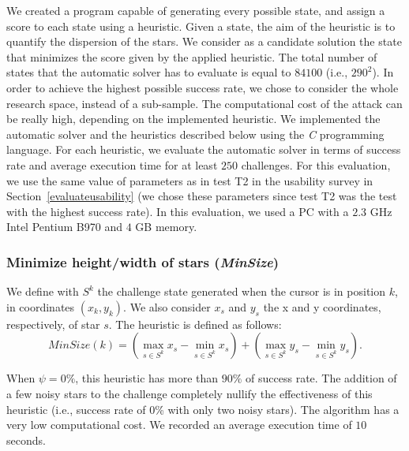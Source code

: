 \documentclass[conference]{IEEEtran}
\newcommand{\hilight}[1]{#1}
\begin{document}
We created a program capable of generating every possible state, and assign a score to each state using a heuristic.
Given a state, the aim of the heuristic is to quantify the dispersion of the stars.
We consider as a candidate solution the state that minimizes the score given by the applied heuristic. The total number of states that the automatic solver has to evaluate is equal to $84100$ (i.e., $290^2$).
\hilight{In order to achieve the highest possible success rate, we chose to consider the whole research space, instead of a sub-sample.}
The computational cost of the attack can be really high, depending on the implemented heuristic.
We implemented the automatic solver and the heuristics described below using the \textit{C} programming language.
For each heuristic, we evaluate the automatic solver in terms of success rate and average execution time for at least $250$ challenges.
For this evaluation, we use the same value of parameters as in test T2 in the usability survey in Section~\ref{evaluateusability} 
(we chose these parameters since test T2 was the test with the highest success rate). 
In this evaluation, we used a PC with a $2.3$ GHz Intel Pentium B970 and $4$ GB memory.

\subsubsection{Minimize height/width of stars (\textit{MinSize})}
We define with $S^k$ the challenge state generated when the cursor is in position $k$, in coordinates $(x_k,y_k)$.
We also consider $x_s$ and $y_s$ the x and y coordinates, respectively, of star $s$.
The heuristic is defined as follows: 
$$ {MinSize}(k) = \left(\max_{s\in S^k } x_s - \min_{s\in S^k } x_s \right) + \left( \max_{s\in S^k } y_s- \min_{s\in S^k } y_s \right).$$


When $\psi = 0\%$, this heuristic has more than $90\%$ of success rate.
The addition of a few noisy stars to the challenge completely nullify the effectiveness of this heuristic (i.e., success rate of 0\% with only two noisy stars). The algorithm has a very low computational cost.
We recorded an average execution time of $10$ seconds.
\end{document}
